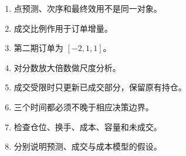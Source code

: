 \begin{enumerate}[leftmargin=*]
  \item 点预测、次序和最终效用不是同一对象。
  \item 成交比例作用于订单增量。
  \item 第二期订单为 $[-2,1,1]$。
  \item 对分数放大倍数做尺度分析。
  \item 成交受限时只更新已成交部分，保留原有持仓。
  \item 三个时间都必须不晚于相应决策边界。
  \item 检查仓位、换手、成本、容量和未成交。
  \item 分别说明预测、成交与成本模型的假设。
\end{enumerate}

